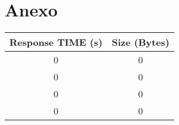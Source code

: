 \chapter{Anexo} \label{ch:anexo}

\begin{table}[]
	
	\centering
	\begin{tabular}[scale=0.5]{|c|c|}
		\hline		
		\textbf{Response TIME (s)} & \textbf{Size (Bytes)} \\ \hline
		0                          & 0                     \\ \hline
		0                          & 0                     \\ \hline
		0                          & 0                     \\ \hline
		0                          & 0                     \\ \hline


\end{tabular}
\end{table}
